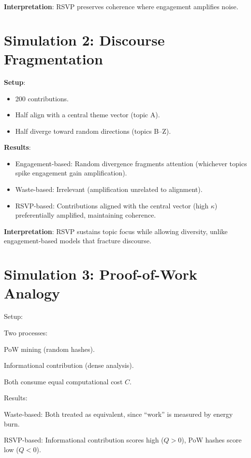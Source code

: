 \documentclass[openany]{book}
\begin{document}
\textbf{Interpretation}: RSVP preserves coherence where engagement amplifies noise.

\section{Simulation 2: Discourse Fragmentation}

\textbf{Setup}:

\begin{itemize}
    \item 200 contributions.
    \item Half align with a central theme vector (topic A).
    \item Half diverge toward random directions (topics B--Z).
\end{itemize}

\textbf{Results}:

\begin{itemize}
    \item Engagement-based: Random divergence fragments attention (whichever topics spike engagement gain amplification).
    \item Waste-based: Irrelevant (amplification unrelated to alignment).
    \item RSVP-based: Contributions aligned with the central vector (high $\kappa$) preferentially amplified, maintaining coherence.
\end{itemize}

\textbf{Interpretation}: RSVP sustains topic focus while allowing diversity, unlike engagement-based models that fracture discourse.


\section{Simulation 3: Proof-of-Work Analogy}

Setup:

Two processes:

PoW mining (random hashes).

Informational contribution (dense analysis).

Both consume equal computational cost \( C \).

Results:

Waste-based: Both treated as equivalent, since ``work'' is measured by energy burn.

RSVP-based: Informational contribution scores high (\( Q > 0 \)), PoW hashes score low (\( Q < 0 \)).
\end{document}

